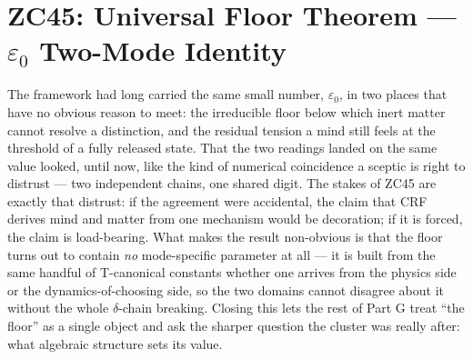 \documentclass[12pt, a4paper]{article}
\begin{document}
\section{ZC45: Universal Floor Theorem --- $\varepsilon_0$ Two-Mode
  Identity}
\label{sec:zc45}

The framework had long carried the same small number, $\varepsilon_0$, in two
places that have no obvious reason to meet: the irreducible floor below which
inert matter cannot resolve a distinction, and the residual tension a mind
still feels at the threshold of a fully released state. That the two readings
landed on the same value looked, until now, like the kind of numerical
coincidence a sceptic is right to distrust --- two independent chains, one
shared digit. The stakes of ZC45 are exactly that distrust: if the agreement
were accidental, the claim that CRF derives mind and matter from one mechanism
would be decoration; if it is forced, the claim is load-bearing. What makes the
result non-obvious is that the floor turns out to contain \emph{no} mode-specific
parameter at all --- it is built from the same handful of T-canonical constants
whether one arrives from the physics side or the dynamics-of-choosing side, so
the two domains cannot disagree about it without the whole $\delta$-chain
breaking. Closing this lets the rest of Part G treat ``the floor'' as a single
object and ask the sharper question the cluster was really after: what algebraic
structure sets its value.
\end{document}

